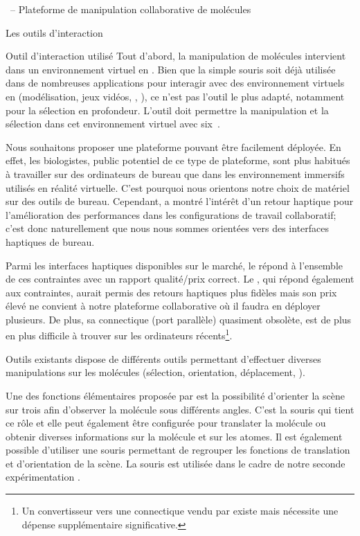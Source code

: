 \documentclass[myfrancais,ngerman,english,french]{mythesis}
\begin{document}
\begin{mychapter}{\myShaddock\ -- Plateforme de manipulation collaborative de molécules}
\begin{mysection}{Les outils d'interaction}
\begin{mysubsection}{Outil d'interaction utilisé}
				Tout d'abord, la manipulation de molécules intervient dans un environnement virtuel en \myThreeD.
				Bien que la simple souris soit déjà utilisée dans de nombreuses applications pour interagir avec des environnement virtuels en \myThreeD (modélisation, jeux vidéos, \myCAO, \myetc), ce n'est pas l'outil le plus adapté, notamment pour la sélection en profondeur.
				L'outil doit permettre la manipulation et la sélection dans cet environnement virtuel \myThreeD avec six~.

				Nous souhaitons proposer une plateforme pouvant être facilement déployée.
				En effet, les biologistes, public potentiel de ce type de plateforme, sont plus habitués à travailler sur des ordinateurs de bureau que dans les environnement immersifs utilisés en réalité virtuelle.
				C'est pourquoi nous orientons notre choix de matériel sur des outils de bureau.
				Cependant,  a montré l'intérêt d'un retour haptique pour l'amélioration des performances dans les configurations de travail collaboratif; c'est donc naturellement que nous nous sommes orientées vers des interfaces haptiques de bureau.

				Parmi les interfaces haptiques disponibles sur le marché, le \myOmni répond à l'ensemble de ces contraintes avec un rapport qualité/prix correct.
				Le \myDesktop, qui répond également aux contraintes, aurait permis des retours haptiques plus fidèles mais son prix élevé ne convient à notre plateforme collaborative où il faudra en déployer plusieurs.
				De plus, sa connectique (port parallèle) quasiment obsolète, est de plus en plus difficile à trouver sur les ordinateurs récents\footnote{Un convertisseur vers une connectique \myFireWire vendu par \mySensAble existe mais nécessite une dépense supplémentaire significative.}.
			\end{mysubsection}
			\begin{mysubsection}{Outils existants}
				 dispose de différents outils permettant d'effectuer diverses manipulations sur les molécules (sélection, orientation, déplacement, \myetc).

				Une des fonctions élémentaires proposée par  est la possibilité d'orienter la scène sur trois  afin d'observer la molécule sous différents angles.
				C'est la souris qui tient ce rôle et elle peut également être configurée pour translater la molécule ou obtenir diverses informations sur la molécule et sur les atomes.
				Il est également possible d'utiliser une souris \myThreeD permettant de regrouper les fonctions de translation et d'orientation de la scène.
				La souris \myThreeD \mySpaceNavigator est utilisée dans le cadre de notre seconde expérimentation .


\end{mysubsection}
\end{mysection}
\end{mychapter}
\end{document}
